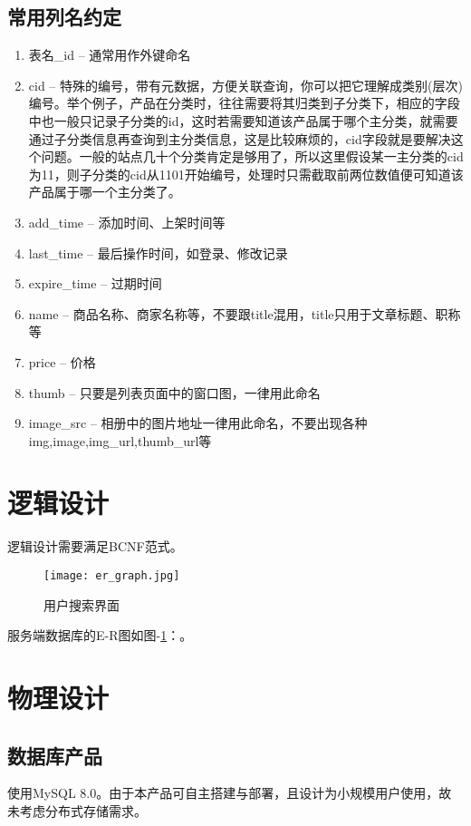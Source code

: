 \subsection{常用列名约定}
\begin{enumerate}
    \item 表名\_id – 通常用作外键命名
    \item cid – 特殊的编号，带有元数据，方便关联查询，你可以把它理解成类别(层次)编号。举个例子，产品在分类时，往往需要将其归类到子分类下，相应的字段中也一般只记录子分类的id，这时若需要知道该产品属于哪个主分类，就需要通过子分类信息再查询到主分类信息，这是比较麻烦的，cid字段就是要解决这个问题。一般的站点几十个分类肯定是够用了，所以这里假设某一主分类的cid为11，则子分类的cid从1101开始编号，处理时只需截取前两位数值便可知道该产品属于哪一个主分类了。
    \item add\_time – 添加时间、上架时间等
    \item last\_time – 最后操作时间，如登录、修改记录
    \item expire\_time – 过期时间
    \item name – 商品名称、商家名称等，不要跟title混用，title只用于文章标题、职称等
    \item price – 价格
    \item thumb – 只要是列表页面中的窗口图，一律用此命名
    \item image\_src – 相册中的图片地址一律用此命名，不要出现各种img,image,img\_url,thumb\_url等
\end{enumerate}

\section{逻辑设计}
逻辑设计需要满足BCNF范式。
\begin{figure}[h]
	\centering
	\texttt{[image: er\_graph.jpg]}
	\caption{用户搜索界面} \label{fig:er_graph}
\end{figure}
服务端数据库的E-R图如图-\ref{fig:er_graph}：。

\section{物理设计}
\subsection{数据库产品}
使用MySQL 8.0。由于本产品可自主搭建与部署，且设计为小规模用户使用，故未考虑分布式存储需求。

